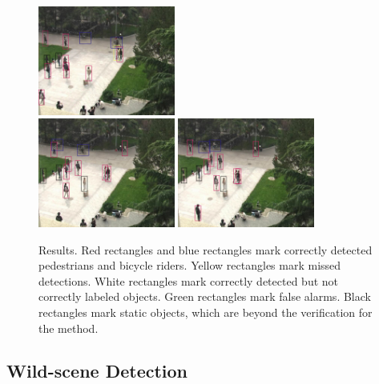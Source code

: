 \begin{figure}
\includegraphics[width=0.4\textwidth,bb=0 0 720 576]{251.jpg}\\
\includegraphics[width=0.4\textwidth,bb=0 0 720 576]{326.jpg}
\includegraphics[width=0.4\textwidth,bb=0 0 720 576]{366.jpg}\\
\caption[Detection results]{Results. Red rectangles and blue rectangles mark correctly detected pedestrians and bicycle riders. Yellow rectangles mark missed detections. White rectangles mark correctly detected but not correctly labeled objects. Green rectangles mark false alarms. Black rectangles mark static objects, which are beyond the verification for the method.}
\label{fig:result}
\end{figure}

\subsection{Wild-scene Detection}

